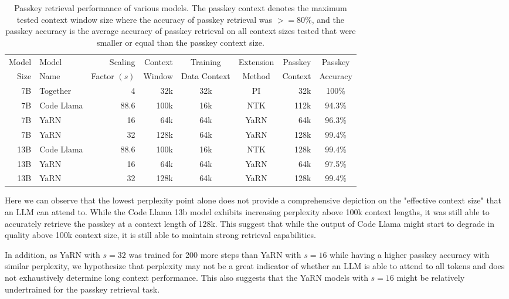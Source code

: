 \documentclass{article} %
\begin{document}
\begin{table}[H]
    \centering
    \begin{tabular}{rlrrccrc}
        \toprule
        Model & Model & Scaling       & Context &  Training & Extension & Passkey & Passkey  \\
         Size &  Name &  Factor $(s)$ & Window  & Data Context &    Method &  Context & Accuracy \\
        \midrule
          7B &   Together & 4 &  32k & 32k &   PI & 32k & 100\% \\
          7B & Code Llama & 88.6 & 100k & 16k &  NTK & 112k & 94.3\% \\
          7B &       YaRN & 16 &  64k & 64k & YaRN & 64k & 96.3\% \\
          7B &       YaRN & 32 & 128k & 64k & YaRN & 128k & 99.4\% \\
        \midrule
         13B & Code Llama & 88.6 & 100k & 16k &  NTK & 128k & 99.4\% \\
         13B & YaRN & 16 &  64k & 64k & YaRN & 64k & 97.5\% \\
         13B & YaRN & 32 & 128k & 64k & YaRN & 128k & 99.4\% \\        
        \bottomrule
    \end{tabular}
    \caption{\small Passkey retrieval performance of various models. The passkey context denotes the maximum tested context window size where the accuracy of passkey retrieval was $>=80\%$, and the passkey accuracy is the average accuracy of passkey retrieval on all context sizes tested that were smaller or equal than the passkey context size.}
    \label{tab:passkey}
\end{table}

Here we can observe that the lowest perplexity point alone does not provide a comprehensive depiction on the "effective context size" that an LLM can attend to. While the Code Llama 13b model exhibits increasing perplexity above 100k context lengths, it was still able to accurately retrieve the passkey at a context length of 128k. This suggest that while the output of Code Llama might start to degrade in quality above 100k context size, it is still able to maintain strong retrieval capabilities.

In addition, as YaRN with $s=32$ was trained for 200 more steps than YaRN with $s=16$ while having a higher passkey accuracy with similar perplexity, we hypothesize that perplexity may not be a great indicator of whether an LLM is able to attend to all tokens and does not exhaustively determine long context performance.
This also suggests that the YaRN models with $s=16$ might be relatively undertrained for the passkey retrieval task.
\end{document}

